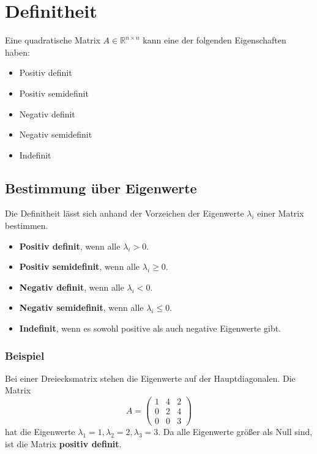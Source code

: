 \chapter{Definitheit}

Eine quadratische Matrix \(A \in \mathbb{R}^{n \times n}\) kann eine der folgenden Eigenschaften haben:
\begin{itemize}
    \item Positiv definit
    \item Positiv semidefinit
    \item Negativ definit
    \item Negativ semidefinit
    \item Indefinit
\end{itemize}

\section{Bestimmung über Eigenwerte}
Die Definitheit lässt sich anhand der Vorzeichen der Eigenwerte \(\lambda_i\) einer Matrix bestimmen.
\begin{itemize}
    \item \textbf{Positiv definit}, wenn alle \(\lambda_i > 0\).
    \item \textbf{Positiv semidefinit}, wenn alle \(\lambda_i \geq 0\).
    \item \textbf{Negativ definit}, wenn alle \(\lambda_i < 0\).
    \item \textbf{Negativ semidefinit}, wenn alle \(\lambda_i \leq 0\).
    \item \textbf{Indefinit}, wenn es sowohl positive als auch negative Eigenwerte gibt.
\end{itemize}

\subsection{Beispiel}
Bei einer Dreiecksmatrix stehen die Eigenwerte auf der Hauptdiagonalen. Die Matrix
\[ A = \begin{pmatrix}
    1 & 4 & 2 \\
    0 & 2 & 4 \\
    0 & 0 & 3
\end{pmatrix} \]
hat die Eigenwerte \(\lambda_1 = 1, \lambda_2 = 2, \lambda_3 = 3\). Da alle Eigenwerte größer als Null sind, ist die Matrix \textbf{positiv definit}.

